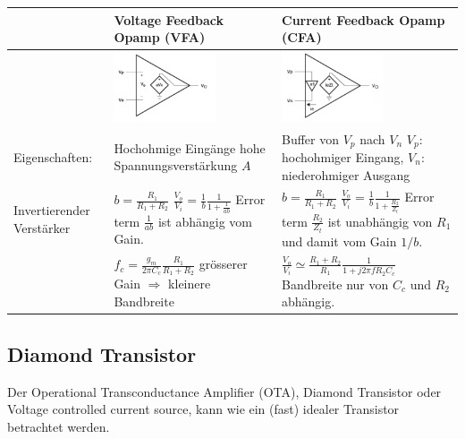\begin{tabularx}{\linewidth}{p{3cm}XX}
	&\textbf{Voltage Feedback Opamp (VFA)} & \textbf{Current Feedback Opamp (CFA)} \\
	\hline
	& \includegraphics[width=3cm]{images/op_vfa.jpg} & \includegraphics[width=3cm]{images/op_cfa.jpg} \\
	Eigenschaften: & Hochohmige Eingänge \newline hohe Spannungsverstärkung $A$ & Buffer von $V_p$ nach $V_n$ \newline $V_p$: hochohmiger Eingang, $V_n$: niederohmiger Ausgang \\
	Invertierender Verstärker & $b = \frac{R_1}{R_1 + R_2}$ \newline $\frac{V_o}{V_i} = \frac{1}{b} \frac{1}{1+\frac{1}{a b}}$ \newline Error term $\frac{1}{ab}$ ist abhängig vom Gain. & $b = \frac{R_1}{R_1 + R_2}$ \newline $\frac{V_o}{V_i} = \frac{1}{b} \frac{1}{1 + \frac{R_2}{Z_t}}$ \newline Error term $\frac{R_2}{Z_t}$ ist unabhängig von $R_1$ und damit vom Gain $1/b$. \\
	& $f_c = \frac{g_m}{2 \pi C_c} \frac{R_1}{R_1 + R_2}$ \newline grösserer Gain $\Rightarrow$ kleinere Bandbreite & $\frac{V_o}{V_i} \simeq \frac{R_1 + R_2}{R_1} \frac{1}{1 + j 2 \pi f R_2 C_c}$ \newline Bandbreite nur von $C_c$ und $R_2$ abhängig. \\
	\hline
\end{tabularx}


\subsection{Diamond Transistor}
Der Operational Transconductance Amplifier (OTA), Diamond Transistor oder
Voltage controlled current source, kann wie ein (fast) idealer Transistor
betrachtet werden. 

